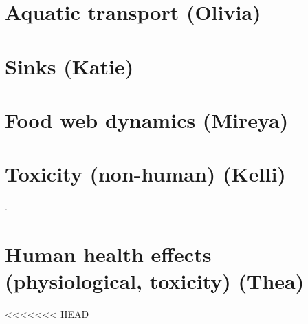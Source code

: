 \documentclass{article}\usepackage[]{graphicx}\usepackage[]{color}
\begin{document}
\section{Aquatic transport (Olivia)}

\section{Sinks (Katie)}

\section{Food web dynamics (Mireya)}

\section{Toxicity (non-human) (Kelli)}

. 


\section{Human health effects (physiological, toxicity) (Thea)}

<<<<<<< HEAD
\end{document}
